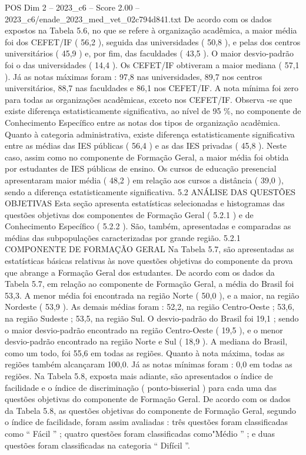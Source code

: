 \begin{textsample}{POS Dim 2 – 2023\_c6 – Score 2.00 – 2023\_c6/enade\_2023\_med\_vet\_02c794d841.txt}
De acordo com os dados expostos na Tabela 5.6, no que se refere à organização acadêmica, a maior média foi dos CEFET/IF ( 56,2 ), seguida das universidades ( 50,8 ), e pelas dos centros universitários ( 45,9 ) e, por fim, das faculdades ( 43,5 ).
O maior desvio-padrão foi o das universidades ( 14,4 ).
Os CEFET/IF obtiveram a maior mediana ( 57,1 ).
Já as notas máximas foram : 97,8 nas universidades, 89,7 nos centros universitários, 88,7 nas faculdades e 86,1 nos CEFET/IF.
A nota mínima foi zero para todas as organizações acadêmicas, exceto nos CEFET/IF.
Observa -se que existe diferença estatisticamente significativa, ao nível de 95 \%, no componente de Conhecimento Específico entre as notas dos tipos de organização acadêmica.
Quanto à categoria administrativa, existe diferença estatisticamente significativa entre as médias das IES públicas ( 56,4 ) e as das IES privadas ( 45,8 ).
Neste caso, assim como no componente de Formação Geral, a maior média foi obtida por estudantes de IES públicas de ensino.
Os cursos de educação presencial apresentaram maior média ( 48,2 ) em relação aos cursos a distância ( 39,0 ), sendo a diferença estatisticamente significativa. 5.2 ANÁLISE DAS QUESTÕES OBJETIVAS Esta seção apresenta estatísticas selecionadas e histogramas das questões objetivas dos componentes de Formação Geral ( 5.2.1 ) e de Conhecimento Específico ( 5.2.2 ).
São, também, apresentadas e comparadas as médias das subpopulações caracterizadas por grande região. 5.2.1 COMPONENTE DE FORMAÇÃO GERAL Na Tabela 5.7, são apresentadas as estatísticas básicas relativas às nove questões objetivas do componente da prova que abrange a Formação Geral dos estudantes.
De acordo com os dados da Tabela 5.7, em relação ao componente de Formação Geral, a média do Brasil foi 53,3.
A menor média foi encontrada na região Norte ( 50,0 ), e a maior, na região Nordeste ( 53,9 ).
As demais médias foram : 52,2, na região Centro-Oeste ; 53,6, na região Sudeste ; 53,5, na região Sul.
O desvio-padrão do Brasil foi 19,1 ; sendo o maior desvio-padrão encontrado na região Centro-Oeste ( 19,5 ), e o menor desvio-padrão encontrado na região Norte e Sul ( 18,9 ).
A mediana do Brasil, como um todo, foi 55,6 em todas as regiões.
Quanto à nota máxima, todas as regiões também alcançaram 100,0.
Já as notas mínimas foram : 0,0 em todas as regiões.
Na Tabela 5.8, exposta mais adiante, são apresentados o índice de facilidade e o índice de discriminação ( ponto-bisserial ) para cada uma das questões objetivas do componente de Formação Geral.
De acordo com os dados da Tabela 5.8, as questões objetivas do componente de Formação Geral, segundo o índice de facilidade, foram assim avaliadas : três questões foram classificadas como “ Fácil ” ; quatro questões foram classificadas como"Médio ” ; e duas questões foram classificadas na categoria “ Difícil ”.

\end{textsample}
